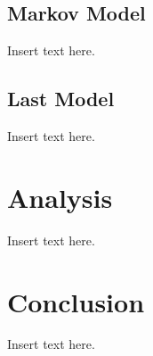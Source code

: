 \documentclass[twoside,twocolumn]{article}
\begin{document}

\subsection{Markov Model}
Insert text here.

\subsection{Last Model}
Insert text here.

\section{Analysis}
\label{sec:analysis}
Insert text here.

\section{Conclusion}
\label{sec:conclusion}
Insert text here.

\end{document}
